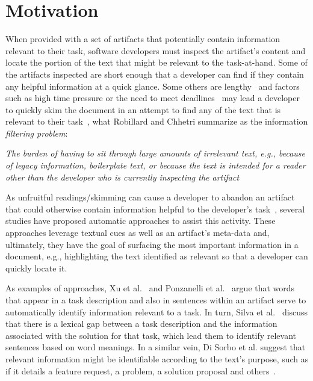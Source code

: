 \section{Motivation}
\label{cp5:motivation}


When provided with a set of artifacts that potentially contain information relevant to their task,
software developers must inspect the artifact's content and locate the portion of the text that might be relevant to the task-at-hand. 
Some of the artifacts inspected are short enough that a developer can find if they contain any helpful information at a quick glance.
Some others are lengthy~\cite{Rastkar2013t} and factors such
as high time pressure or
the need to meet deadlines~\cite{meyer2019}
may lead a developer to quickly skim the document
in an attempt to find any of the text that is relevant to their task~\cite{Starke2009},
what Robillard and Chhetri summarize as the information \textit{filtering problem}:

\smallskip
\begin{bluequote}
    \textit{The burden  of having to sit through large amounts of irrelevant text, e.g., because of legacy information, boilerplate text, or because the text is intended for a reader other than the developer who is currently inspecting the artifact}~\cite{Robillard2015}
\end{bluequote}



As unfruitful readings/skimming can 
cause a developer to abandon an artifact that could otherwise contain information  helpful to the developer's task~\cite{Brandt2009a, Starke2009},
several studies have proposed automatic approaches to assist this activity. 
These approaches leverage textual cues as well as an artifact's meta-data and, ultimately, they have the goal of surfacing 
the most important information in a document, e.g., highlighting the text identified as relevant so that a developer can quickly 
locate it.


As examples of approaches, Xu et al.~\cite{Xu2017} and Ponzanelli et al.~\cite{Ponzanelli2015}
argue that words that appear in a task description and also in sentences within an artifact serve to automatically identify information relevant to a task.
In turn, Silva et al.~\cite{silva2019} discuss that 
there is a lexical gap between a task description and the information associated 
with the solution for that task, which lead them to identify
relevant sentences based on word meanings.
In a similar vein, Di Sorbo et al. suggest that relevant information might be identifiable 
according to the text's purpose, such as if it details a feature request, a problem, a solution proposal and others~\cite{Sorbo2015}.


